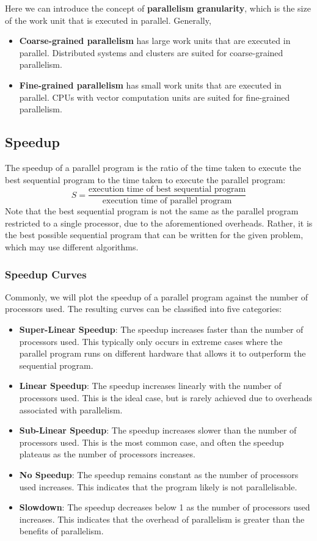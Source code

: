 \documentclass{article}
\begin{document}
Here we can introduce the concept of \textbf{parallelism granularity},
which is the size of the work unit that is executed in parallel.
Generally,
\begin{itemize}
    \item \textbf{Coarse-grained parallelism} has large work units that
          are executed in parallel. Distributed systems and clusters
          are suited for coarse-grained parallelism.
    \item \textbf{Fine-grained parallelism} has small work units that
          are executed in parallel. CPUs with vector computation units
          are suited for fine-grained parallelism.
\end{itemize}
\subsection{Speedup}
The speedup of a parallel program is the ratio of the time taken to
execute the best sequential program to the time taken to execute the
parallel program:
\begin{equation}
    S = \frac{\text{execution time of best sequential program}}{\text{execution time of parallel program}}
\end{equation}
Note that the best sequential program is not the same as the parallel
program restricted to a single processor, due to the aforementioned
overheads. Rather, it is the best possible sequential program that can
be written for the given problem, which may use different algorithms.
\subsubsection{Speedup Curves}
Commonly, we will plot the speedup of a parallel program against the
number of processors used. The resulting curves can be classified into
five categories:
\begin{itemize}
    \item \textbf{Super-Linear Speedup}: The speedup increases faster
          than the number of processors used. This typically only occurs
          in extreme cases where the parallel program runs on different
          hardware that allows it to outperform the sequential program.
    \item \textbf{Linear Speedup}: The speedup increases linearly with
          the number of processors used. This is the ideal case, but is
          rarely achieved due to overheads associated with parallelism.
    \item \textbf{Sub-Linear Speedup}: The speedup increases slower than
          the number of processors used. This is the most common case,
          and often the speedup plateaus as the number of processors
          increases.
    \item \textbf{No Speedup}: The speedup remains constant as the
          number of processors used increases. This indicates that the
          program likely is not parallelisable.
    \item \textbf{Slowdown}: The speedup decreases below 1 as the number
          of processors used increases. This indicates that the overhead
          of parallelism is greater than the benefits of parallelism.
\end{itemize}
\end{document}
